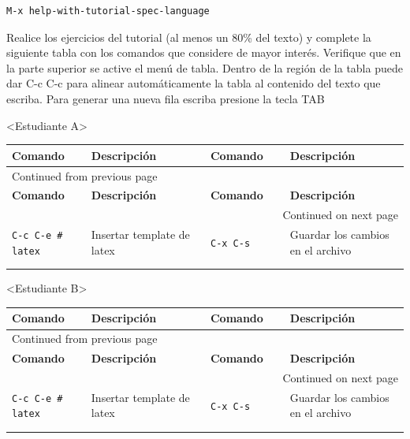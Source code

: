 \documentclass{article}
\begin{document}
\begin{verbatim}
M-x help-with-tutorial-spec-language
\end{verbatim}

Realice los ejercicios del tutorial (al menos un 80\% del texto) y
complete la siguiente tabla con los comandos que considere de mayor
interés. Verifique que en la parte superior se active el menú de
tabla. Dentro de la región de la tabla puede dar C-c C-c para alinear
automáticamente la tabla al contenido del texto que escriba. Para
generar una nueva fila escriba presione la tecla TAB

<Estudiante A>
\begin{longtable}{|p{0.2\linewidth}|p{0.3\linewidth}|p{0.2\linewidth}|p{0.3\linewidth}|}
\textbf{Comando} & \textbf{Descripción} & \textbf{Comando} & \textbf{Descripción}\\[0pt]
\hline
\endfirsthead
\multicolumn{4}{l}{Continued from previous page} \\[0pt]
\hline

\textbf{Comando} & \textbf{Descripción} & \textbf{Comando} & \textbf{Descripción} \\[0pt]

\hline
\endhead
\hline\multicolumn{4}{r}{Continued on next page} \\
\endfoot
\endlastfoot
\hline
\texttt{C-c C-e \# latex} & Insertar template de  latex & \texttt{C-x C-s} & Guardar los cambios en el archivo\\[0pt]
 &  &  & \\[0pt]
 &  &  & \\[0pt]
\end{longtable}

<Estudiante B>
\begin{longtable}{|p{0.2\linewidth}|p{0.3\linewidth}|p{0.2\linewidth}|p{0.3\linewidth}|}
\textbf{Comando} & \textbf{Descripción} & \textbf{Comando} & \textbf{Descripción}\\[0pt]
\hline
\endfirsthead
\multicolumn{4}{l}{Continued from previous page} \\[0pt]
\hline

\textbf{Comando} & \textbf{Descripción} & \textbf{Comando} & \textbf{Descripción} \\[0pt]

\hline
\endhead
\hline\multicolumn{4}{r}{Continued on next page} \\
\endfoot
\endlastfoot
\hline
\texttt{C-c C-e \# latex} & Insertar template de  latex & \texttt{C-x C-s} & Guardar los cambios en el archivo\\[0pt]
 &  &  & \\[0pt]
 &  &  & \\[0pt]
\end{longtable}
\end{document}

